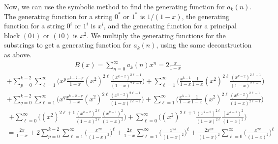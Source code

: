 \documentclass[12pt]{article}
\begin{document}
Now, we can use the symbolic method to find the generating function for $a_k(n)$. The generating function for a string $0^*$ or $1^*$ is $1/(1-x)$, the generating function for a string $0^i$ or $1^{i}$ is $x^{i}$, and the generating function for a principal block $(01)$ or $(10)$ is $x^{2}$. We multiply the generating functions for the substrings to get a generating function for $a_k(n)$, using the same deconstruction as above. 
\begin{equation*}\begin{gathered}B(x) = \sum_{n=0}^{\infty} a_k(n)x^n = 2\frac{x}{1-x} 
\end{gathered}\end{equation*}
\begin{equation*}\begin{gathered} + \sum_{p=0}^{k-2} \sum_{\ell=1}^{\infty}\bigg(x^p \frac{x^{k-2-p}}{1-x} (x^2)^{2\ell} \frac{(x^{k-2})^{2\ell-1}}{(1-x)^{2\ell-1}}\bigg)  +\sum_{\ell=1}^{\infty}\bigg(\frac{x^{k-1}}{1-x} \frac{1}{1-x} (x^2)^{2\ell} \frac{(x^{k-2})^{2\ell-1}}{(1-x)^{2\ell-1}}\bigg)
\end{gathered}\end{equation*}
\begin{equation*}\begin{gathered}
 + \sum_{q=0}^{k-2} \sum_{\ell=1}^{\infty}\bigg(x^q \frac{x^{k-2-q}}{1-x} (x^2)^{2\ell} \frac{(x^{k-2})^{2\ell-1}}{(1-x)^{2\ell-1}}\bigg)  +\sum_{\ell=1}^{\infty}\bigg(\frac{x^{k-1}}{1-x} \frac{1}{1-x} (x^2)^{2\ell} \frac{(x^{k-2})^{2\ell-1}}{(1-x)^{2\ell-1}}\bigg) 
 \end{gathered}\end{equation*}
\begin{equation*}\begin{gathered} + \sum_{\ell=0}^{\infty} \bigg( (x^2)^{2\ell+1} \frac{(x^{k-2})^{2\ell}}{(1-x)^{2\ell}} \frac{(x^{k-1})^2}{(1-x)^2}\bigg) + \sum_{\ell=0}^{\infty} \bigg((x^2)^{2\ell+1} \frac{(x^{k-2})^{2\ell}}{(1-x)^{2\ell}} \frac{(x^{k-1})^2}{(1-x)^2}\bigg)\end{gathered}\end{equation*}
\begin{equation*}\begin{gathered}
 = \frac{2x}{1-x} + 2\sum_{p=0}^{k-2} \sum_{\ell=1}^{\infty} \bigg(\frac{x^{2k}}{(1-x)^2}\bigg)^{\ell} + \frac{2x}{1-x} \sum_{\ell=1}^{\infty} \bigg(\frac{x^{2k}}{(1-x)^2}\bigg)^{\ell} + \frac{2x^{2k}}{(1-x)^2} \sum_{\ell=0}^{\infty} \bigg(\frac{x^{2k}}{(1-x)^2}\bigg)^{\ell}
\end{gathered}\end{equation*}
\end{document}
